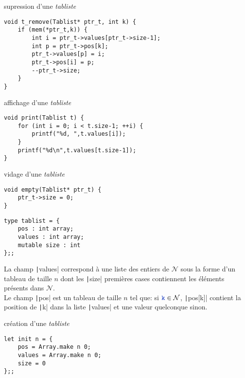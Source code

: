 \begin{fnc*}{supression d'une \emph{tabliste}}
\begin{verbatim}
void t_remove(Tablist* ptr_t, int k) {
    if (mem(*ptr_t,k)) {
        int i = ptr_t->values[ptr_t->size-1];
        int p = ptr_t->pos[k];
        ptr_t->values[p] = i;
        ptr_t->pos[i] = p;
        --ptr_t->size;
    }
}
\end{verbatim}
\end{fnc*}
\begin{fnc*}{affichage d'une \emph{tabliste}}
\begin{verbatim}
void print(Tablist t) {
    for (int i = 0; i < t.size-1; ++i) {
        printf("%d, ",t.values[i]);
    }
    printf("%d\n",t.values[t.size-1]);
}
\end{verbatim}
\end{fnc*}
\begin{fnc*}{vidage d'une \emph{tabliste}}
\begin{verbatim}
void empty(Tablist* ptr_t) {
    ptr_t->size = 0;
}
\end{verbatim}
\end{fnc*}
\ocaml
\begin{tp*}{}
\begin{verbatim}
type tablist = {
    pos : int array;
    values : int array;
    mutable size : int
};;
\end{verbatim}
La champ \texttt|values| correspond à une liste des entiers de $\mathcal{N}$ sous la forme d'un tableau de taille $n$ dont les \texttt|size| premières cases contiennent les éléments présents dans $\mathcal{N}$.\\Le champ \texttt|pos| est un tableau de taille $n$ tel que: si $\vr{k}\in\mathcal{N}$, \texttt|pos[k]| contient la position de \texttt|k| dans la liste \texttt|values| et une valeur quelconque sinon.
\end{tp*}
\begin{fnc*}{création d'une \emph{tabliste}}
\begin{verbatim}
let init n = {
    pos = Array.make n 0;
    values = Array.make n 0;
    size = 0
};;
\end{verbatim}
\end{fnc*}
